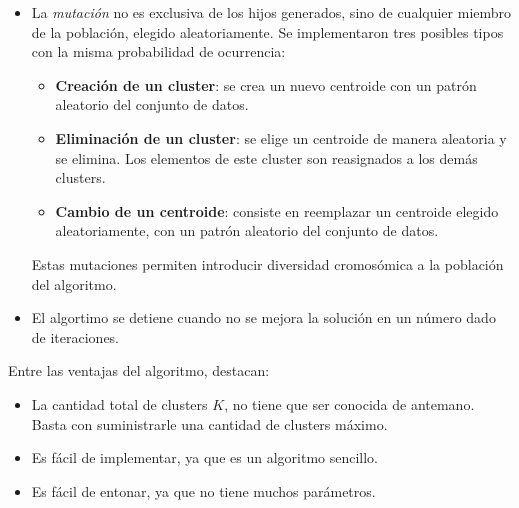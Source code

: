 \begin{itemize}
    \item La \emph{mutación} no es exclusiva de los hijos generados, sino de
cualquier miembro de la población, elegido aleatoriamente. Se implementaron tres
posibles tipos con la misma probabilidad de o\-cu\-rren\-cia:
    \begin{itemize}
        \item \textbf{Creación de un cluster}: se crea un nuevo centroide con un
patrón aleatorio del conjunto de datos.
        \item \textbf{Eliminación de un cluster}: se elige un centroide de manera
aleatoria y se elimina. Los elementos de este cluster son reasignados a los
demás clusters.
        \item \textbf{Cambio de un centroide}: consiste en reemplazar un centroide elegido aleatoriamente, con un patrón aleatorio del conjunto de datos.
    \end{itemize}
    Estas mutaciones permiten introducir diversidad cromosómica a la población
del algoritmo.
    \item El algortimo se detiene cuando no se mejora la solución en un
número dado de iteraciones.
\end{itemize}

    Entre las ventajas del algoritmo, destacan:
\begin{itemize}
    \item La cantidad total de clusters $K$, no tiene que ser conocida de
antemano. Basta con suministrarle una cantidad de clusters máximo.
    \item Es fácil de implementar, ya que es un algoritmo sencillo.
    \item Es fácil de entonar, ya que no tiene muchos parámetros.
\end{itemize}

